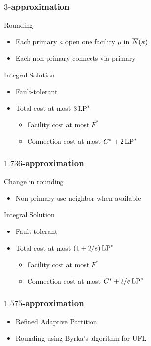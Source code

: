 \documentclass[handout, hyperref, dvipsnames]{beamer}
\begin{document}
\begin{frame}
  \frametitle{$3$-approximation}

  Rounding
  \begin{itemize}
  \item Each primary $\kappa$ open one facility $\mu$ in ${\overline{N}}(\kappa)$
  \item Each non-primary connects via primary
  \end{itemize}

  Integral Solution
  \begin{itemize}
  \item Fault-tolerant
  \item Total cost at most $3\,\mbox{\rm LP}^\ast$
    \begin{itemize}
    \item Facility cost at most $F^\ast$
    \item Connection cost at most $C^\ast + 2\,\mbox{\rm LP}^\ast$
    \end{itemize}
  \end{itemize}

\end{frame}

\begin{frame}
  \frametitle{$1.736$-approximation} 

  Change in rounding
  \begin{itemize}
  \item Non-primary use neighbor when available
  \end{itemize}

  Integral Solution
  \begin{itemize}
  \item Fault-tolerant
  \item Total cost at most $(1+2/e)\,\mbox{\rm LP}^\ast$
    \begin{itemize}
    \item Facility cost at most $F^\ast$
    \item Connection cost at most $C^\ast + 2/e\, \mbox{\rm LP}^\ast$
    \end{itemize}
  \end{itemize}

\end{frame}

\begin{frame}
  \frametitle{$1.575$-approximation}
  \begin{itemize}
  \item Refined Adaptive Partition
  \item Rounding using Byrka's algorithm for UFL
  \end{itemize}
\end{frame}
\end{document}
